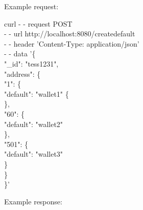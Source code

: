 Example request:

\begin{framed}
\hspace*{13mm}    curl - - request POST \\
\hspace*{13mm}        - - url http://localhost:8080/createdefault \\
\hspace*{13mm}        - - header 'Content-Type: application/json' \\
\hspace*{13mm}        - - data '\{ \\
\hspace*{20mm}                "\_id": "tess1231",\\
\hspace*{27mm}                "address": \{ \\
\hspace*{35mm}                "1": \{ \\
\hspace*{40mm}                "default": "wallet1" \{ \\
\hspace*{40mm}                \}, \\
\hspace*{35mm}                "60": \{ \\
\hspace*{40mm}                "default": "wallet2" \\
\hspace*{40mm}                \}, \\
\hspace*{35mm}                "501": \{ \\
\hspace*{40mm}                "default": "wallet3" \\
\hspace*{40mm}                \} \\
\hspace*{27mm}              \} \\
\hspace*{20mm}            \}' \\
\end{framed}


Example response:


